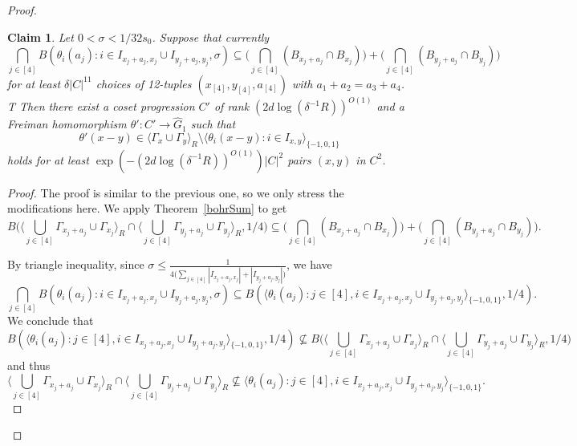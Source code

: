 \documentclass[a4paper,11pt]{article}
\numberwithin{theorem}{section}
\newtheorem{claim}[theorem]{Claim}
\theoremstyle{definition}
\begin{document}
\begin{proof}
    \begin{claim}\label{claim2bilbogarg}
        Let $0 < \sigma < 1/32s_0$. Suppose that currently 
        \begin{equation}\bigcap_{j \in [4]} B(\theta_i(a_j) : i \in I_{x_j + a_j, x_j} \cup I_{y_j + a_j, y_j}, \sigma) \subseteq \Big(\bigcap_{j \in [4]}(B_{x_j + a_j} \cap B_{x_j})\Big) + \Big(\bigcap_{j \in [4]}(B_{y_j + a_j} \cap B_{y_j})\Big)\label{secondbogclaimeqn}\end{equation}
        \textbf{} for at least $\delta|C|^{11}$ choices of 12-tuples $(x_{[4]}, y_{[4]}, a_{[4]})$ with $a_1 + a_2 = a_3 + a_4$. T Then there exist a coset progression $C'$ of rank $(2d\log (\delta^{-1} R))^{O(1)}$ and a Freiman homomorphism $\theta' : C' \to \hat{G}_1$ such that 
        \[\theta'(x - y) \in \langle \Gamma_x \cup \Gamma_y \rangle_R \setminus \langle \theta_i(x - y) : i \in I_{x,y} \rangle_{\{-1,0,1\}}\]
        holds for at least $\exp(-(2d\log (\delta^{-1} R))^{O(1)})|C|^2$ pairs $(x,y)$ in $C^2$.
    \end{claim}

    \begin{proof}
        The proof is similar to the previous one, so we only stress the modifications here. We apply Theorem~\ref{bohrSum} to get
        \[B\Big(\langle \bigcup_{j \in [4]}\Gamma_{x_j + a_j} \cup \Gamma_{x_j}\rangle_R \cap \langle \bigcup_{j \in [4]}\Gamma_{y_j + a_j} \cup \Gamma_{y_j}\rangle_R, 1/4\Big) \subseteq  \Big(\bigcap_{j \in [4]}(B_{x_j + a_j} \cap B_{x_j})\Big) + \Big(\bigcap_{j \in [4]}(B_{y_j + a_j} \cap B_{y_j})\Big).\]
        
        By triangle inequality, since $\sigma \leq \frac{1}{4 \Big(\sum_{j \in [4]} |I_{x_j + a_j, x_j}| + |I_{y_j + a_j, y_j}|\Big)}$, we have
        \[\bigcap_{j \in [4]} B(\theta_i(a_j) : i \in I_{x_j + a_j, x_j} \cup I_{y_j + a_j, y_j}, \sigma) \subseteq B(\langle \theta_i(a_j) : j \in [4], i \in I_{x_j + a_j, x_j} \cup I_{y_j + a_j, y_j}\rangle_{\{-1,0,1\}}, 1/4).\]
        We conclude that 
        \[B(\langle \theta_i(a_j) : j \in [4], i \in I_{x_j + a_j, x_j} \cup I_{y_j + a_j, y_j}\rangle_{\{-1,0,1\}}, 1/4) \not\subseteq B\Big(\langle \bigcup_{j \in [4]}\Gamma_{x_j + a_j} \cup \Gamma_{x_j}\rangle_R \cap \langle \bigcup_{j \in [4]}\Gamma_{y_j + a_j} \cup \Gamma_{y_j}\rangle_R, 1/4\Big)\]
        and thus
        \[\Big\langle \bigcup_{j \in [4]}\Gamma_{x_j + a_j} \cup \Gamma_{x_j}\Big\rangle_R \cap \Big\langle \bigcup_{j \in [4]}\Gamma_{y_j + a_j} \cup \Gamma_{y_j}\Big\rangle_R \not\subseteq \langle \theta_i(a_j) : j \in [4], i \in I_{x_j + a_j, x_j} \cup I_{y_j + a_j, y_j}\rangle_{\{-1,0,1\}}.\] 
        

\end{proof}
\end{proof}
\end{document}
